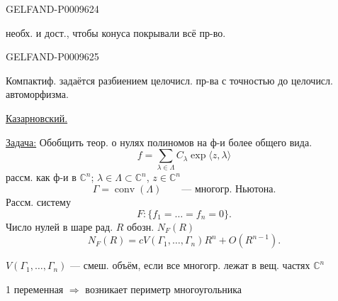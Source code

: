 \begin{GelfandAdjacentEvidence}{GELFAND-P000962}{4}


 необх. и дост., чтобы конуса покрывали всё пр-во.

\end{GelfandAdjacentEvidence}
\begin{GelfandAdjacentEvidence}{GELFAND-P000962}{5}


Компактиф. задаётся разбиением целочисл. пр-ва с точностью до целочисл. автоморфизма.

\underline{\underline{Казарновский.}}

\underline{Задача:} Обобщить теор. о нулях полиномов на ф-и более общего вида.
\begin{equation*}
 f=\sum_{\lambda\in\Lambda}C_\lambda\exp\langle z,\lambda\rangle\tag{1}
\end{equation*}
рассм. как ф-и в $\mathbb{C}^n$; $\lambda\in\Lambda\subset\mathbb{C}^n$, $z\in\mathbb{C}^n$
\[
 \Gamma=\operatorname{conv}(\Lambda)\qquad\text{--- многогр. Ньютона.}
\]
Рассм. систему
\[
 F:\{f_1=\ldots=f_n=0\}.
\]
Число нулей в шаре рад. $R$ обозн. $N_F(R)$
\begin{equation*}
 N_F(R)=cV(\Gamma_1,\ldots,\Gamma_n)R^n+O(R^{n-1}).\tag{2}
\end{equation*}
\end{GelfandAdjacentEvidence}


$V(\Gamma_1,\ldots,\Gamma_n)$ --- смеш. объём, если все многогр. лежат в вещ. частях $\mathbb{C}^n$

1 переменная $\Rightarrow$ возникает периметр многоугольника

